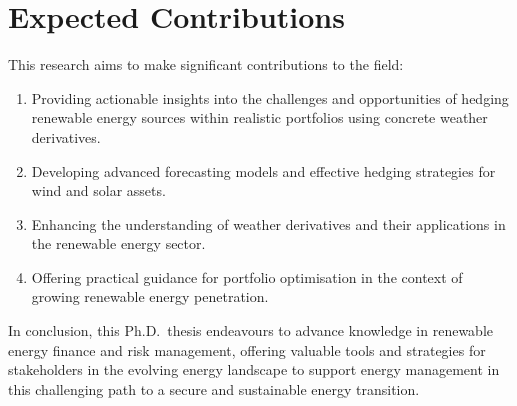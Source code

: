\section{Expected Contributions}
    \label{sec:rs_expected-contributions}

    This research aims to make significant contributions to the field:

    \begin{enumerate}%
        \item Providing actionable insights into the challenges and opportunities of hedging renewable
            energy sources within realistic portfolios using concrete weather derivatives.
        \item Developing advanced forecasting models and effective hedging strategies for wind and solar assets.
        \item Enhancing the understanding of weather derivatives and their applications in the renewable energy sector.
        \item Offering practical guidance for portfolio optimisation in the context of growing
             renewable energy penetration.
    \end{enumerate}

In conclusion, this Ph.D.\ thesis endeavours to advance knowledge in renewable energy finance and risk management,
offering valuable tools and strategies for stakeholders in the evolving energy landscape
to support energy management in this challenging path to a secure and sustainable energy transition.




